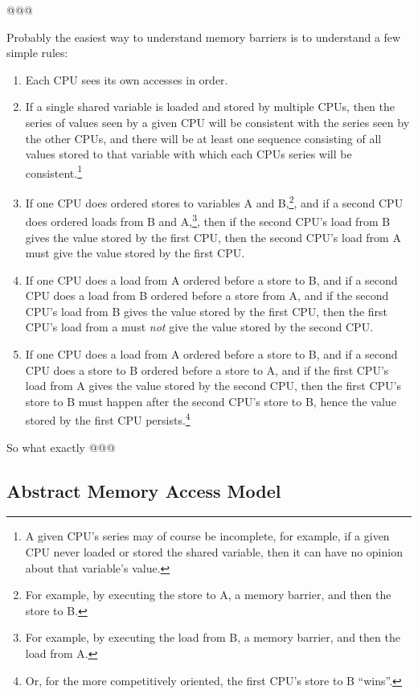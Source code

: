 @@@

Probably the easiest way to understand memory barriers is to understand
a few simple rules:

\begin{enumerate}
\item	Each CPU sees its own accesses in order.
\item	If a single shared variable is loaded and stored by multiple
	CPUs, then the series of values seen by a given CPU will be
	consistent with the series seen by the other CPUs, and there
	will be at least one sequence consisting of all values stored
	to that variable with which each CPUs series will be
	consistent.\footnote{
		A given CPU's series may of course be incomplete,
		for example, if a given CPU never loaded or stored
		the shared variable, then it can have no opinion about
		that variable's value.}
\item	If one CPU does ordered stores to variables A and B,\footnote{
		For example, by executing the store to A, a
		memory barrier, and then the store to B.},
	and if a second CPU does ordered loads from B and A,\footnote{
		For example, by executing the load from B, a
		memory barrier, and then the load from A.},
	then if the second CPU's load from B gives the value stored
	by the first CPU, then the second CPU's load from A must
	give the value stored by the first CPU.
\item	If one CPU does a load from A ordered before a store to B,
	and if a second CPU does a load from B ordered before a store from A,
	and if the second CPU's load from B gives the value stored by
	the first CPU, then the first CPU's load from a must \emph{not}
	give the value stored by the second CPU.
\item	If one CPU does a load from A ordered before a store to B,
	and if a second CPU does a store to B ordered before a
	store to A, and if the first CPU's load from A gives
	the value stored by the second CPU, then the first CPU's
	store to B must happen after the second CPU's store to B,
	hence the value stored by the first CPU persists.\footnote{
		Or, for the more competitively oriented, the first
		CPU's store to B ``wins''.}
\end{enumerate}

So what exactly @@@

\subsection{Abstract Memory Access Model}

